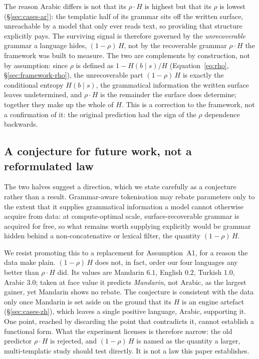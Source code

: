 The reason Arabic differs is not that its $\rho \cdot H$ is highest but that its $\rho$ is lowest (\S\ref{sec:cases-ar}): the templatic half of its grammar sits off the written surface, unreachable by a model that only ever reads text, so providing that structure explicitly pays. The surviving signal is therefore governed by the \emph{unrecoverable} grammar a language hides, $(1-\rho)\,H$, not by the recoverable grammar $\rho \cdot H$ the framework was built to measure. The two are complements by construction, not by assumption: since $\rho$ is defined as $1 - H(b \mid s)/H$ (Equation~\ref{eq:rho}, \S\ref{sec:framework-rho}), the unrecoverable part $(1-\rho)\,H$ is exactly the conditional entropy $H(b \mid s)$, the grammatical information the written surface leaves undetermined, and $\rho \cdot H$ is the remainder the surface does determine; together they make up the whole of $H$. This is a correction to the framework, not a confirmation of it: the original prediction had the sign of the $\rho$ dependence backwards.

\subsection{A conjecture for future work, not a reformulated law}
\label{sec:discussion-reformulated}

The two halves suggest a direction, which we state carefully as a conjecture rather than a result. Grammar-aware tokenisation may rebate parameters only to the extent that it supplies grammatical information a model cannot otherwise acquire from data: at compute-optimal scale, surface-recoverable grammar is acquired for free, so what remains worth supplying explicitly would be grammar hidden behind a non-concatenative or lexical filter, the quantity $(1-\rho)\,H$.

We resist promoting this to a replacement for Assumption~A1, for a reason the data make plain. $(1-\rho)\,H$ does not, in fact, order our four languages any better than $\rho \cdot H$ did. Its values are Mandarin $6.1$, English $0.2$, Turkish $1.0$, Arabic $3.0$; taken at face value it predicts \emph{Mandarin}, not Arabic, as the largest gainer, yet Mandarin shows no rebate. The conjecture is consistent with the data only once Mandarin is set aside on the ground that its $H$ is an engine artefact (\S\ref{sec:cases-zh}), which leaves a single positive language, Arabic, supporting it. One point, reached by discarding the point that contradicts it, cannot establish a functional form. What the experiment licenses is therefore narrow: the old predictor $\rho \cdot H$ is rejected, and $(1-\rho)\,H$ is named as the quantity a larger, multi-templatic study should test directly. It is not a law this paper establishes.

